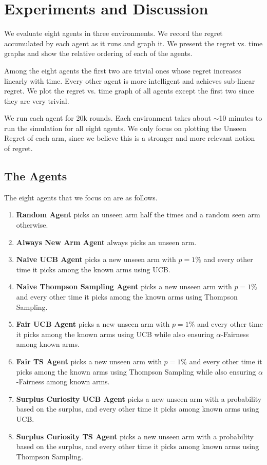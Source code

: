 \section{Experiments and Discussion}

We evaluate eight agents in three environments. We record the regret accumulated by each agent as it runs and graph it. We present the regret vs. time graphs and show the relative ordering of each of the agents.

Among the eight agents the first two are trivial ones whose regret increases linearly with time. Every other agent is more intelligent and achieves sub-linear regret. We plot the regret vs. time graph of all agents except the first two since they are very trivial.

We run each agent for 20k rounds. Each environment takes about $\sim$10 minutes to run the simulation for all eight agents. We only focus on plotting the Unseen Regret of each arm, since we believe this is a stronger and more relevant notion of regret.

\subsection{The Agents}

The eight agents that we focus on are as follows.

\begin{enumerate}
    \item \textbf{Random Agent} picks an unseen arm half the times and a random seen arm otherwise.
    \item \textbf{Always New Arm Agent} always picks an unseen arm.
    \item \textbf{Naive UCB Agent} picks a new unseen arm with $p=1\%$ and every other time it picks among the known arms using UCB.
    \item \textbf{Naive Thompson Sampling Agent} picks a new unseen arm with $p=1\%$ and every other time it picks among the known arms using Thompson Sampling.
    \item \textbf{Fair UCB Agent} picks a new unseen arm with $p=1\%$ and every other time it picks among the known arms using UCB while also ensuring $\alpha$-Fairness among known arms.
    \item \textbf{Fair TS Agent} picks a new unseen arm with $p=1\%$ and every other time it picks among the known arms using Thompson Sampling while also ensuring $\alpha$-Fairness among known arms.
    \item \textbf{Surplus Curiosity UCB Agent} picks a new unseen arm with a probability based on the surplus, and every other time it picks among known arms using UCB.
    \item \textbf{Surplus Curiosity TS Agent} picks a new unseen arm with a probability based on the surplus, and every other time it picks among known arms using Thompson Sampling.
\end{enumerate}

